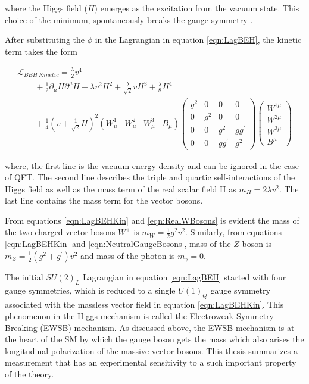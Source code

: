 where the Higgs field ($H$) emerges as the excitation from the vacuum state. This choice of the minimum, spontaneously breaks the gauge symmetry \cite{DESYHiggsLecture}. 

After substituting the $\phi$ in the Lagrangian in equation \ref{eqn:LagBEH}, the kinetic term takes the form

\begin{equation}
\begin{array}{l}
\mathcal{L}_{BEH~Kinetic}  = \frac{\lambda}{2}v^{4} \\
\hspace{25pt}  +\frac{1}{2} \partial_{\mu}H \partial^{\mu}H - \lambda v^{2}H^{2} + \frac{\lambda}{\sqrt{2}} v H^{3} + \frac{\lambda}{8} H^4  \\
\hspace{25pt} + \frac{1}{4} ( v +\frac{1}{\sqrt{2} } H)^2 (W_{\mu}^{1} \hspace{10pt} W_{\mu}^2 \hspace{10pt} W_{\mu}^3 \hspace{10pt} B_{\mu} ) \begin{pmatrix} g^2 & 0 & 0 & 0 \\ 0 & g^2 & 0 & 0 \\  0  & 0 & g^2 & gg^{'} \\ 0  & 0 & gg^{'} & g^{2} \end{pmatrix} \begin{pmatrix} W^{1\mu}\\ W^{2\mu} \\ W^{3\mu} \\ B^{\mu} \end{pmatrix}
\end{array}
\label{eqn:LagBEHKin}
\end{equation}

where, the first line is the vacuum energy density and can be ignored in the case of QFT. The second line describes the triple and quartic self-interactions of the Higgs field as well as the mass term of the real scalar field H as $m_{H} = 2\lambda v^2$. The last line contains the mass term for the vector bosons. 

From equations \ref{eqn:LagBEHKin} and \ref{eqn:RealWBosons} is evident the mass of the two charged vector bosons $W^{\pm}$ is $m_{W}=\frac{1}{2}g^2v^2$. Similarly, from equations \ref{eqn:LagBEHKin} and 
\ref{eqn:NeutralGaugeBosons}, mass of the $Z$ boson is $m_{Z} = \frac{1}{2}(g^2+g^{'})v^2$ and mass of the photon is $m_{\gamma}=0$. 

The initial $SU(2)_{L}$ Lagrangian in equation \ref{eqn:LagBEH} started with four gauge symmetries, which is reduced to a single $U(1)_{Q}$ gauge symmetry associated with the massless vector field in equation \ref{eqn:LagBEHKin}. This phenomenon in the Higgs mechanism is called the Electroweak Symmetry Breaking (EWSB) mechanism. As discussed above, the EWSB mechanism is at the heart of the SM by which the gauge boson gets the mass which also arises the longitudinal polarization of the massive vector bosons. This thesis summarizes a measurement that has an experimental sensitivity to a such important property of the theory.

